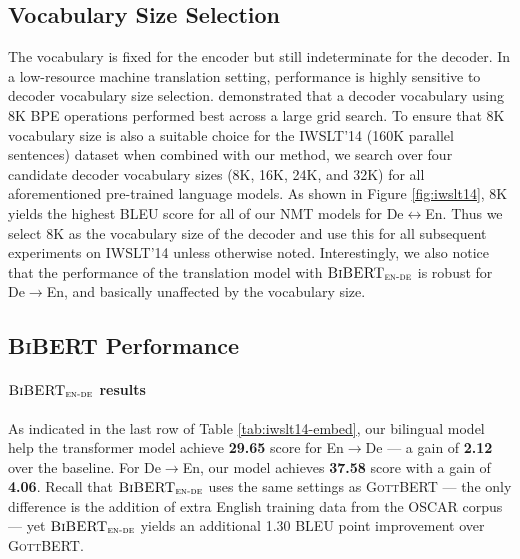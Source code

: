 \documentclass[11pt]{article}
\begin{document}
\subsection{Vocabulary Size Selection}
\label{subsec:vocab}
The vocabulary is fixed for the encoder but still indeterminate for the decoder. In a low-resource machine translation setting, performance is highly sensitive to decoder vocabulary size selection. \citet{gowda-may-2020-finding} demonstrated that a decoder vocabulary using 8K BPE operations performed best across a large grid search. To ensure that 8K vocabulary size is also a suitable choice for the IWSLT'14 (160K parallel sentences) dataset when combined with our method, we search over four candidate decoder vocabulary sizes (8K, 16K, 24K, and 32K) for all aforementioned pre-trained language models. As shown in Figure \ref{fig:iwslt14}, 8K yields the highest BLEU score for all of our NMT models for De$\leftrightarrow$En. Thus we select 8K as the vocabulary size of the decoder and use this for all subsequent experiments on IWSLT'14 unless otherwise noted. Interestingly, we also notice that the performance of the translation model with $\textsc{BiBERT}_\textsc{en-de}$ is robust for De$\rightarrow$En, and basically unaffected by the vocabulary size. 

\subsection{\textsc{BiBERT} Performance}
\paragraph{$\textsc{BiBERT}_\textsc{en-de}$ results} 
As indicated in the last row of Table \ref{tab:iwslt14-embed}, our bilingual model help the transformer model achieve \textbf{29.65} score for En$\rightarrow$De --- a gain of \textbf{2.12} over the baseline. For De$\rightarrow$En, our model achieves \textbf{37.58} score with a gain of \textbf{4.06}.  Recall that $\textsc{BiBERT}_\textsc{en-de}$ uses the same settings as \textsc{GottBERT} --- the only difference is the addition of extra English training data from the OSCAR corpus --- yet
$\textsc{BiBERT}_\textsc{en-de}$ yields an additional 1.30 BLEU point improvement over \textsc{GottBERT}.
\end{document}
